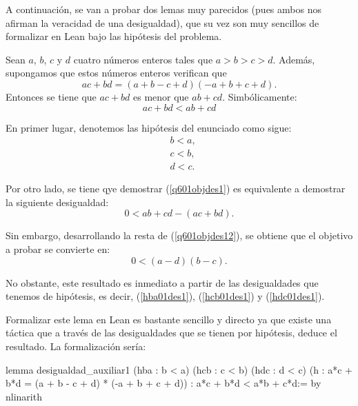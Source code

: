 A continuación, se van a probar dos lemas muy parecidos (pues ambos nos
afirman la veracidad de una desigualdad), que su vez son muy sencillos de
formalizar en Lean bajo las hipótesis del problema.

\begin{lema}\label{lemades1}
  Sean \(a\), \(b\), \(c\) y \(d\) cuatro números enteros tales que
  \(a > b > c > d \). Además, supongamos que
  estos números enteros verifican que
    \begin{equation}
      ac+bd = (a+b-c+d)(-a+b+c+d).
    \end{equation}
    Entonces se tiene que \(ac+bd\) es menor que \(ab+cd\). Simbólicamente:
    \begin{equation}\label{q601objdes1}
      ac+bd<ab+cd
    \end{equation}
\end{lema}

\begin{demostracion}
    En primer lugar, denotemos las hipótesis del enunciado como sigue:
  \begin{align}
    &b<a,\tag{hba}\label{hba01des1}\\
    &c<b,\tag{hcb}\label{hcb01des1}\\
    &d<c.\tag{hdc}\label{hdc01des1}
  \end{align}

  Por otro lado, se tiene qye demostrar (\ref{q601objdes1}) es equivalente
  a demostrar la siguiente desigualdad:
  \begin{equation}\label{q601objdes12}
      0<ab+cd-(ac+bd).
  \end{equation}

  Sin embargo, desarrollando la resta de (\ref{q601objdes12}), se obtiene
  que el objetivo a probar se convierte en:
  \begin{equation}\label{q601objdes13}
      0<(a-d)(b-c).
  \end{equation}

  No obstante, este resultado es inmediato a partir de las desigualdades
  que tenemos de hipótesis, es decir, (\ref{hba01des1}), (\ref{hcb01des1})
  y (\ref{hdc01des1}).
\end{demostracion}

Formalizar este lema en Lean es bastante sencillo y directo ya que existe
una táctica que a través de las desigualdades que se tienen por hipótesis,
deduce el resultado. La formalización sería:
\begin{leancode}
lemma desigualdad_auxiliar1
  (hba : b < a)
  (hcb : c < b)
  (hdc : d < c)
  (h : a*c + b*d = (a + b - c + d) * (-a + b + c + d))
  : a*c + b*d < a*b + c*d:=
by nlinarith
\end{leancode}

